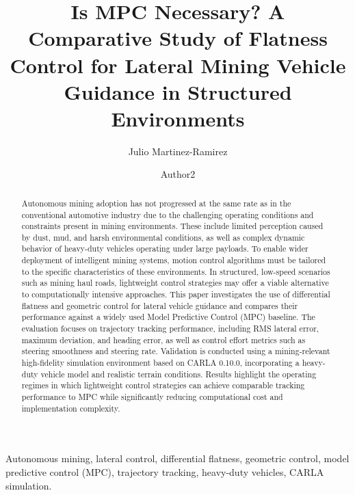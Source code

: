 \documentclass{ifacconf}
\begin{document}
\begin{frontmatter}

\title{Is MPC Necessary? A Comparative Study of Flatness Control for Lateral Mining Vehicle Guidance in Structured Environments}

\author[First]{Julio Martinez-Ramirez}
\author[Second]{Author2}

\address[First]{Caterpillar Inc., Mossville, IL, USA (e-mail: julio.martinez1@cat.com).}
\address[Second]{Some other place}

\begin{abstract}
Autonomous mining adoption has not progressed at the same rate as in the conventional automotive industry due to the challenging operating conditions and constraints present in mining environments. These include limited perception caused by dust, mud, and harsh environmental conditions, as well as complex dynamic behavior of heavy-duty vehicles operating under large payloads.
To enable wider deployment of intelligent mining systems, motion control algorithms must be tailored to the specific characteristics of these environments. In structured, low-speed scenarios such as mining haul roads, lightweight control strategies may offer a viable alternative to computationally intensive approaches.
This paper investigates the use of differential flatness and geometric control for lateral vehicle guidance and compares their performance against a widely used Model Predictive Control (MPC) baseline. The evaluation focuses on trajectory tracking performance, including RMS lateral error, maximum deviation, and heading error, as well as control effort metrics such as steering smoothness and steering rate.
Validation is conducted using a mining-relevant high-fidelity simulation environment based on CARLA 0.10.0, incorporating a heavy-duty vehicle model and realistic terrain conditions. Results highlight the operating regimes in which lightweight control strategies can achieve comparable tracking performance to MPC while significantly reducing computational cost and implementation complexity.
\end{abstract}

\begin{keyword}
Autonomous mining, lateral control, differential flatness, geometric control, model predictive control (MPC), trajectory tracking, heavy-duty vehicles, CARLA simulation.
\end{keyword}

\end{frontmatter}
\end{document}
